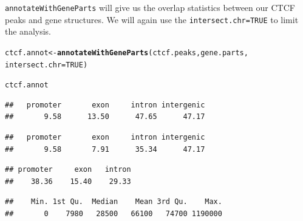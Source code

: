 \documentclass{article}\usepackage[]{graphicx}\usepackage[]{color}
\makeatletter
\newcommand{\hlnum}[1]{\textcolor[rgb]{0.686,0.059,0.569}{#1}}%
\newcommand{\hlstd}[1]{\textcolor[rgb]{0.345,0.345,0.345}{#1}}%
\newcommand{\hlkwb}[1]{\textcolor[rgb]{0.69,0.353,0.396}{#1}}%
\newcommand{\hlkwc}[1]{\textcolor[rgb]{0.333,0.667,0.333}{#1}}%
\newcommand{\hlkwd}[1]{\textcolor[rgb]{0.737,0.353,0.396}{\textbf{#1}}}%
\newenvironment{kframe}{%
 \def\at@end@of@kframe{}%
 \ifinner\ifhmode%
  \def\at@end@of@kframe{\end{minipage}}%
  \begin{minipage}{\columnwidth}%
 \fi\fi%
 \def\FrameCommand##1{\hskip\@totalleftmargin \hskip-\fboxsep
 \colorbox{shadecolor}{##1}\hskip-\fboxsep
     \hskip-\linewidth \hskip-\@totalleftmargin \hskip\columnwidth}%
 \MakeFramed {\advance\hsize-\width
   \@totalleftmargin\z@ \linewidth\hsize
   \@setminipage}}%
 {\par\unskip\endMakeFramed%
 \at@end@of@kframe}
\newenvironment{knitrout}{}{} %
\newcommand{\Rcode}[1]{{\texttt{#1}}}
\makeatother
\begin{document}
\Rcode{annotateWithGeneParts} will give us the  overlap statistics between our 
CTCF peaks and gene structures. We will again use the \Rcode{intersect.chr=TRUE}
to limit the analysis.
\begin{knitrout}
\color{fgcolor}\begin{kframe}
\begin{alltt}
\hlstd{ctcf.annot} \hlkwb{<-} \hlkwd{annotateWithGeneParts}\hlstd{(ctcf.peaks, gene.parts,}
    \hlkwc{intersect.chr} \hlstd{=} \hlnum{TRUE}\hlstd{)}
\end{alltt}


{\ttfamily\noindent\itshape\color{messagecolor}{\#\# intersecting chromosomes...}}\begin{alltt}
\hlstd{ctcf.annot}
\end{alltt}


{\ttfamily\noindent\itshape\color{messagecolor}{\#\# Summary of target set annotation with genic parts\\\#\# Rows in target set: 1681\\\#\# -----------------------\\\#\# percentage of target features overlapping with annotation:}}\begin{verbatim}
##   promoter       exon     intron intergenic 
##       9.58      13.50      47.65      47.17
\end{verbatim}


{\ttfamily\noindent\itshape\color{messagecolor}{\#\# \\\#\# percentage of target features overlapping with annotation:\\\#\# (with promoter > exon > intron precedence):}}\begin{verbatim}
##   promoter       exon     intron intergenic 
##       9.58       7.91      35.34      47.17
\end{verbatim}


{\ttfamily\noindent\itshape\color{messagecolor}{\#\# \\\#\# percentage of annotation boundaries with feature overlap:}}\begin{verbatim}
## promoter     exon   intron 
##    38.36    15.40    29.33
\end{verbatim}


{\ttfamily\noindent\itshape\color{messagecolor}{\#\# \\\#\# summary of distances to the nearest TSS:}}\begin{verbatim}
##    Min. 1st Qu.  Median    Mean 3rd Qu.    Max. 
##       0    7980   28500   66100   74700 1190000
\end{verbatim}


{\ttfamily\noindent\itshape\color{messagecolor}{\#\# }}\end{kframe}
\end{knitrout}
\end{document}
